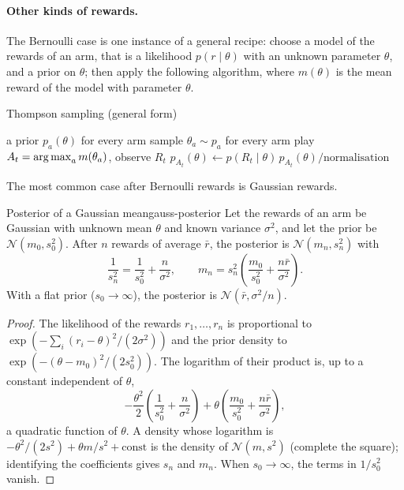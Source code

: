 \paragraph{Other kinds of rewards.} The Bernoulli case is one instance of
a general recipe: choose a model of the rewards of an arm, that is a
likelihood $p(r \mid \theta)$ with an unknown parameter $\theta$, and a
prior on $\theta$; then apply the following algorithm, where $m(\theta)$ is
the mean reward of the model with parameter $\theta$.

\begin{algobox}{Thompson sampling (general form)}
  \begin{algorithmic}[1]
    \State a prior $p_a(\theta)$ for every arm
      \State sample $\theta_a \sim p_a$ for every arm
      \State play $A_t = \operatorname*{arg\,max}_a m(\theta_a)$, observe $R_t$
      \State $p_{A_t}(\theta) \gets p(R_t \mid \theta)\, p_{A_t}(\theta) /
        \text{normalisation}$ 
    \EndFor
  \end{algorithmic}
\end{algobox}

The most common case after Bernoulli rewards is Gaussian rewards.

\begin{proposition}{Posterior of a Gaussian mean}{gauss-posterior}
  Let the rewards of an arm be Gaussian with unknown mean $\theta$ and
  known variance $\sigma^2$, and let the prior be $\mathcal{N}(m_0,
  s_0^2)$. After $n$ rewards of average $\bar r$, the posterior is
  $\mathcal{N}(m_n, s_n^2)$ with
  \begin{equation}
    \frac{1}{s_n^2} = \frac{1}{s_0^2} + \frac{n}{\sigma^2}, \qquad m_n =
    s_n^2 \left( \frac{m_0}{s_0^2} + \frac{n \bar r}{\sigma^2} \right).
  \end{equation}
  With a flat prior ($s_0 \to \infty$), the posterior is $\mathcal{N}(\bar
  r, \sigma^2 / n)$.
\end{proposition}

\begin{proof}
  The likelihood of the rewards $r_1, \dots, r_n$ is proportional to
  $\exp(-\sum_i (r_i - \theta)^2 / (2 \sigma^2))$ and the prior density to
  $\exp(-(\theta - m_0)^2 / (2 s_0^2))$. The logarithm of their product is,
  up to a constant independent of $\theta$,
  \begin{equation*}
    -\frac{\theta^2}{2} \left( \frac{1}{s_0^2} + \frac{n}{\sigma^2}
    \right) + \theta \left( \frac{m_0}{s_0^2} + \frac{n \bar r}{\sigma^2}
    \right),
  \end{equation*}
  a quadratic function of $\theta$. A density whose logarithm is
  $-\theta^2 / (2 s^2) + \theta m / s^2 + \text{const}$ is the density of
  $\mathcal{N}(m, s^2)$ (complete the square); identifying the
  coefficients gives $s_n$ and $m_n$. When $s_0 \to \infty$, the terms in
  $1/s_0^2$ vanish.
\end{proof}

